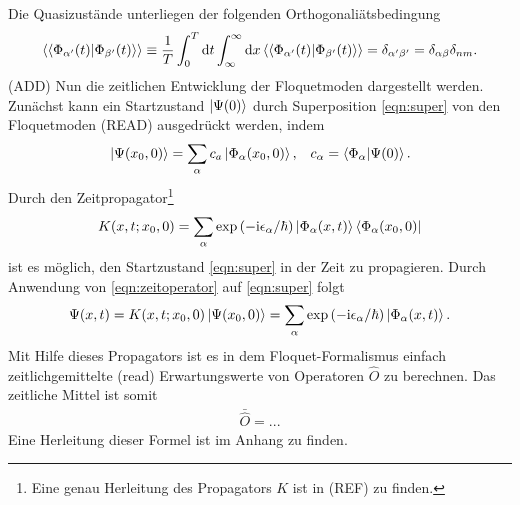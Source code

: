 Die Quasizustände unterliegen der folgenden Orthogonaliätsbedingung
\begin{align}
  \braket{\braket{\Phi_{\alpha' }(t)|\Phi_{\beta'}(t)}}\equiv \frac{1}{T} \int_0^T\mathrm{d}t \int_{\infty}^{\infty} \mathrm{d}x
   \braket{\braket{\Phi_{\alpha' }(t)|\Phi_{\beta'}(t)}}=\delta_{\alpha'\beta'}=\delta_{\alpha\beta}\delta_{nm}.
\end{align}
(ADD)
Nun die zeitlichen Entwicklung der Floquetmoden
dargestellt werden.
Zunächst kann ein Startzustand $\ket{\Psi(0)}$ durch
Superposition \eqref{eqn:super} von den Floquetmoden (READ) ausgedrückt werden, indem
\begin{align}
  \ket{\Psi(x_0,0)}=\sum_\alpha c_a\ket{\Phi_\alpha(x_0,0)},&   &c_\alpha=\braket{\Phi_\alpha|\Psi(0)}.  \label{eqn:super}
\end{align}
Durch den Zeitpropagator\footnote{Eine genau Herleitung des Propagators $K$ ist in (REF) zu finden.}
\begin{align}
  K(x,t;x_0,0)=\sum_\alpha \exp\left(-\mathrm{i}\epsilon_\alpha/ \hbar \right)\ket{\Phi_\alpha(x,t)}\bra{\Phi_\alpha(x_0,0)} \label{eqn:zeitoperator}
\end{align}
ist es möglich, den Startzustand \eqref{eqn:super}
in der Zeit zu propagieren.
Durch Anwendung von \eqref{eqn:zeitoperator} auf \eqref{eqn:super}
folgt
\begin{align}
  \Psi(x,t)=K(x,t;x_0,0) \ket{\Psi(x_0,0)}=\sum_\alpha \exp\left(-\mathrm{i}\epsilon_\alpha/ \hbar \right)\ket{\Phi_\alpha(x,t)}.
\end{align}
Mit Hilfe dieses Propagators ist es in dem Floquet-Formalismus einfach zeitlichgemittelte (read) Erwartungswerte von
Operatoren $\hat O$ zu berechnen.
Das zeitliche Mittel ist somit
\begin{align}
  \bar{\hat O}=...
\end{align}
Eine Herleitung dieser Formel ist im Anhang zu finden.


